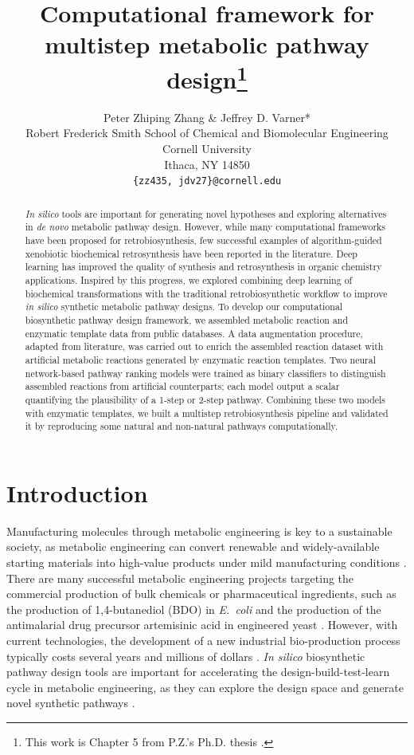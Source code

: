 \documentclass{article}
\title{Computational framework for multistep metabolic pathway design\thanks{This work is Chapter 5 from P.Z.'s Ph.D. thesis \citep{zhang2021developing}.}}
\author{%
  Peter Zhiping Zhang \& Jeffrey D. Varner* \\
  Robert Frederick Smith School of Chemical and Biomolecular Engineering\\
  Cornell University\\
  Ithaca, NY 14850 \\
  \texttt{\{zz435,\: jdv27\}@cornell.edu} \\
}
\begin{document}
\maketitle


\begin{abstract}
\emph{In silico} tools are important for generating novel hypotheses and exploring alternatives in \emph{de novo} metabolic pathway design.
However, while many computational frameworks have been proposed for retrobiosynthesis, few successful examples of algorithm-guided xenobiotic biochemical retrosynthesis have been reported in the literature.
Deep learning has improved the quality of synthesis and retrosynthesis in organic chemistry applications.
Inspired by this progress, we explored combining deep learning of biochemical transformations with the traditional retrobiosynthetic workflow to improve \emph{in silico} synthetic metabolic pathway designs.
To develop our computational biosynthetic pathway design framework, we assembled metabolic reaction and enzymatic template data from public databases. 
A data augmentation procedure, adapted from literature, was carried out to enrich the assembled reaction dataset with artificial metabolic reactions generated by enzymatic reaction templates. 
Two neural network-based pathway ranking models were trained as binary classifiers to distinguish assembled reactions from artificial counterparts; each model output a scalar quantifying the plausibility of a 1-step or 2-step pathway. 
Combining these two models with enzymatic templates, we built a multistep retrobiosynthesis pipeline and validated it by reproducing some natural and non-natural pathways computationally.

\end{abstract}

\section{Introduction} \label{sec:intro}
Manufacturing molecules through metabolic engineering is key to a sustainable society, as metabolic engineering can convert renewable and widely-available starting materials into high-value products under mild manufacturing conditions \citep{keasling2010manufacturing}.
There are many successful metabolic engineering projects targeting the commercial production of bulk chemicals or pharmaceutical ingredients, such as the production of 1,4-butanediol (BDO) in \textit{E.~coli} \citep{yim2011metabolic} and the production of the antimalarial drug precursor artemisinic acid in engineered yeast \citep{ro2006production}.
However, with current technologies, the development of a new industrial bio-production process typically costs several years and millions of dollars \citep{nielsen2016engineering}. 
\textit{In silico} biosynthetic pathway design tools are important for accelerating the design-build-test-learn cycle in metabolic engineering, as they can explore the design space and generate novel synthetic pathways \citep{nielsen2016engineering, keasling2010manufacturing}.
\end{document}
